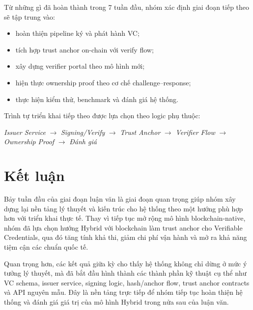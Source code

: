 Từ những gì đã hoàn thành trong 7 tuần đầu, nhóm xác định giai đoạn tiếp theo sẽ tập trung vào:
\begin{itemize}
    \item hoàn thiện pipeline ký và phát hành VC;
    \item tích hợp trust anchor on-chain với verify flow;
    \item xây dựng verifier portal theo mô hình mới;
    \item hiện thực ownership proof theo cơ chế challenge--response;
    \item thực hiện kiểm thử, benchmark và đánh giá hệ thống.
\end{itemize}

Trình tự triển khai tiếp theo được lựa chọn theo logic phụ thuộc:
\begin{center}
\textit{Issuer Service} $\rightarrow$ \textit{Signing/Verify} $\rightarrow$ \textit{Trust Anchor} $\rightarrow$ \textit{Verifier Flow} $\rightarrow$ \textit{Ownership Proof} $\rightarrow$ \textit{Đánh giá}
\end{center}

\section{Kết luận}

Bảy tuần đầu của giai đoạn luận văn là giai đoạn quan trọng giúp nhóm xây dựng lại nền tảng lý thuyết và kiến trúc cho hệ thống theo một hướng phù hợp hơn với triển khai thực tế. Thay vì tiếp tục mở rộng mô hình blockchain-native, nhóm đã lựa chọn hướng Hybrid với blockchain làm trust anchor cho Verifiable Credentials, qua đó tăng tính khả thi, giảm chi phí vận hành và mở ra khả năng tiệm cận các chuẩn quốc tế.

Quan trọng hơn, các kết quả giữa kỳ cho thấy hệ thống không chỉ dừng ở mức ý tưởng lý thuyết, mà đã bắt đầu hình thành các thành phần kỹ thuật cụ thể như VC schema, issuer service, signing logic, hash/anchor flow, trust anchor contracts và API nguyên mẫu. Đây là nền tảng trực tiếp để nhóm tiếp tục hoàn thiện hệ thống và đánh giá giá trị của mô hình Hybrid trong nửa sau của luận văn.